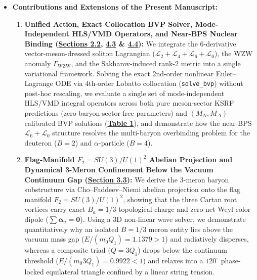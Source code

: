 \documentclass[10pt,aps,prd,twocolumn,superscriptaddress,nofootinbib,floatfix,longbibliography,showkeys]{revtex4-2}
\begin{document}
\begin{itemize}
\begin{enumerate}
  \end{enumerate}
  \item \textbf{Contributions and Extensions of the Present Manuscript:}
  \begin{enumerate}
    \item \textbf{Unified Action, Exact Collocation BVP Solver, Mode-Independent HLS/VMD Operators, and Near-BPS Nuclear Binding (\hyperref[sec:2.2]{Sections 2.2}, \hyperref[sec:4.3]{4.3} \& \hyperref[sec:4.4]{4.4}):} We integrate the 6-derivative vector-meson-dressed soliton Lagrangian ($\mathcal{L}_2 + \mathcal{L}_4 + \mathcal{L}_6 + \mathcal{L}_0$), the WZW anomaly $\Gamma_{\text{WZW}}$, and the Sakharov-induced rank-2 metric into a single variational framework. Solving the exact 2nd-order nonlinear Euler--Lagrange ODE via 4th-order Lobatto collocation (\texttt{solve\_bvp}) without post-hoc rescaling, we evaluate a single set of mode-independent HLS/VMD integral operators across both pure meson-sector KSRF predictions (zero baryon-sector free parameters) and $(M_N, M_\Delta)$-calibrated BVP solutions (\textbf{\hyperref[tab:table1]{Table 1}}), and demonstrate how the near-BPS $\mathcal{L}_6 + \mathcal{L}_0$ structure resolves the multi-baryon overbinding problem for the deuteron ($B=2$) and $\alpha$-particle ($B=4$).
    \item \textbf{Flag-Manifold $F_2 = SU(3)/U(1)^2$ Abelian Projection and Dynamical 3-Meron Confinement Below the Vacuum Continuum Gap (\hyperref[sec:3.3]{Section 3.3}):} We derive the 3-meron baryon substructure via Cho--Faddeev--Niemi abelian projection onto the flag manifold $F_2 = SU(3)/U(1)^2$, showing that the three Cartan root vortices carry exact $B_a = 1/3$ topological charge and zero net Weyl color dipole ($\sum \boldsymbol{\alpha}_a = \mathbf{0}$). Using a 3D non-linear wave solver, we demonstrate quantitatively why an isolated $B=1/3$ meron entity lies above the vacuum mass gap ($E/(m_0 Q_1) = 1.1379 > 1$) and radiatively disperses, whereas a composite triad ($Q = 3Q_1$) drops below the continuum threshold ($E/(m_0 3Q_1) = 0.9922 < 1$) and relaxes into a $120^\circ$ phase-locked equilateral triangle confined by a linear string tension.

\end{enumerate}
\end{itemize}
\end{document}

